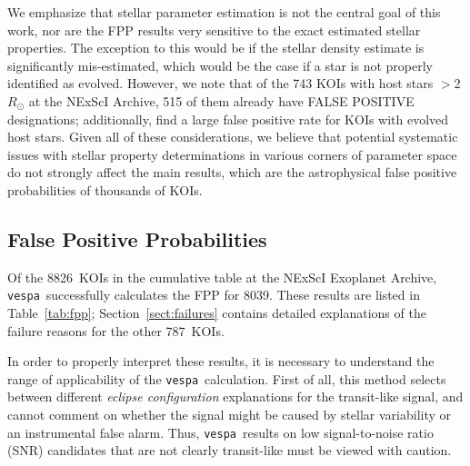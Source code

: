 \documentclass{emulateapj}
\newcommand{\Tab}[1]{Table~\ref{tab:#1}}
\newcommand{\tab}[1]{\Tab{#1}}
\newcommand{\sectionname}{Section}
\newcommand{\Sect}[1]{\sectionname~\ref{sect:#1}}
\newcommand{\sect}[1]{\Sect{#1}}
\newcommand{\sectlabel}[1]{\label{sect:#1}}
\newcommand{\ntotal}{8826}
\newcommand{\nfail}{787}
\newcommand{\ncalc}{8039}
\newcommand{\vespa}{\texttt{vespa}}
\begin{document}
We emphasize that stellar parameter estimation is not the central goal
of this work, nor are the FPP results very sensitive to the exact
estimated stellar properties.  The exception to this would be if the
stellar density estimate is significantly mis-estimated, which would
be the case if a star is not properly identified as evolved.  However,
we note that of the 743 KOIs with host stars $>$2\,$R_{\odot}$ at the
NExScI Archive, 515 of them already have FALSE POSITIVE designations;
additionally, \citet{Sliski:2014} find a large false positive rate for
KOIs with evolved host stars.  Given all of these considerations, we
believe that potential systematic issues with stellar property
determinations in various corners of parameter space do not strongly
affect the main results, which are the astrophysical false positive
probabilities of thousands of KOIs.






\subsection{False Positive Probabilities}
\sectlabel{results:fpp}

Of the \ntotal\ KOIs in the cumulative table at the NExScI Exoplanet
Archive, \vespa\ successfully calculates the FPP for \ncalc.  These
results are listed in \tab{fpp};  \sect{failures} contains detailed
explanations of the failure reasons for the other \nfail\ KOIs.

In order to properly interpret these results, it is necessary to
understand the range of applicability of the \vespa\ calculation.
First of all, this method selects between different \emph{eclipse
  configuration} explanations for the transit-like signal, and cannot
comment on whether the signal might be caused by stellar variability
or an instrumental false alarm.  Thus, \vespa\ results on low
signal-to-noise ratio (SNR) candidates that are not clearly
transit-like must be viewed with caution.  
\end{document}
